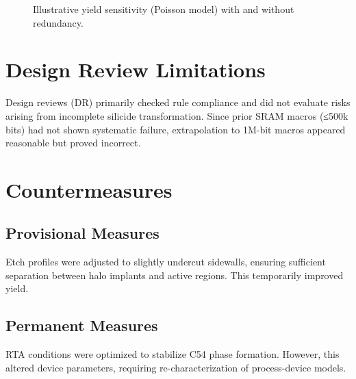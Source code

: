 \documentclass[conference]{IEEEtran}
\begin{document}
\begin{figure}[!t]
  \centering
  \caption{Illustrative yield sensitivity (Poisson model) with and without redundancy.}
  \label{fig:yield}
\end{figure}

\section{Design Review Limitations}
Design reviews (DR) primarily checked rule compliance and did not evaluate risks arising from incomplete silicide transformation.  
Since prior SRAM macros (≤500k bits) had not shown systematic failure, extrapolation to 1M-bit macros appeared reasonable but proved incorrect.  

\section{Countermeasures}
\subsection{Provisional Measures}
Etch profiles were adjusted to slightly undercut sidewalls, ensuring sufficient separation between halo implants and active regions.  
This temporarily improved yield.

\subsection{Permanent Measures}
RTA conditions were optimized to stabilize C54 phase formation.  
However, this altered device parameters, requiring re-characterization of process-device models.
\end{document}
